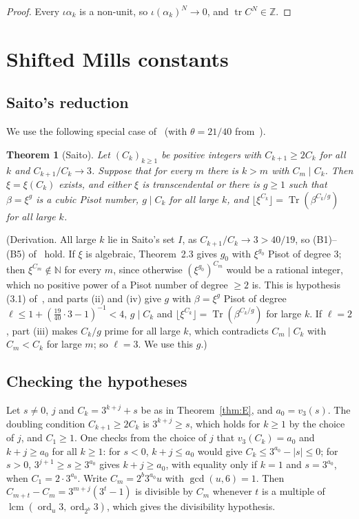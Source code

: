 \documentclass[11pt]{amsart}
\newtheorem{theorem}{Theorem}[section]
\theoremstyle{definition}
\newcommand{\Z}{\mathbb{Z}}
\newcommand{\N}{\mathbb{N}}
\newcommand{\tr}{\operatorname{tr}}
\newcommand{\Tr}{\operatorname{Tr}}
\newcommand{\ord}{\operatorname{ord}}
\newcommand{\floor}[1]{\lfloor #1 \rfloor}
\begin{document}
\begin{proof}
Every $\iota\alpha_k$ is a non-unit, so $\iota(\alpha_k)^N\to0$, and $\tr C^N\in\Z$.
\end{proof}

\section{Shifted Mills constants}\label{sec:E}

\subsection{Saito's reduction}
We use the following special case of~\cite[Theorem~2.3 and Proposition~3.1]{Sai25c} (with $\theta=21/40$ from~\cite{BHP01}).

\begin{theorem}[Saito]\label{thm:saito}
Let $(C_k)_{k\ge1}$ be positive integers with $C_{k+1}\ge2C_k$ for all $k$ and $C_{k+1}/C_k\to3$.  Suppose that for every $m$ there is $k>m$ with $C_m\mid C_k$.  Then $\xi=\xi(C_k)$ exists, and either $\xi$ is transcendental or there is $g\ge1$ such that $\beta=\xi^g$ is a cubic Pisot number, $g\mid C_k$ for all large $k$, and $\floor{\xi^{C_k}}=\Tr(\beta^{C_k/g})$ for all large $k$.
\end{theorem}

(Derivation.  All large $k$ lie in Saito's set $I$, as $C_{k+1}/C_k\to3>40/19$, so (B1)--(B5) of~\cite[Theorem~2.3]{Sai25c} hold.  If $\xi$ is algebraic, Theorem~2.3 gives $g_0$ with $\xi^{g_0}$ Pisot of degree $3$; then $\xi^{C_m}\notin\N$ for every $m$, since otherwise $(\xi^{g_0})^{C_m}$ would be a rational integer, which no positive power of a Pisot number of degree $\ge2$ is.  This is hypothesis (3.1) of~\cite[Proposition~3.1]{Sai25c}, and parts (ii) and (iv) give $g$ with $\beta=\xi^g$ Pisot of degree $\ell\le1+(\tfrac{19}{40}\cdot3-1)^{-1}<4$, $g\mid C_k$ and $\floor{\xi^{C_k}}=\Tr(\beta^{C_k/g})$ for large $k$.  If $\ell=2$, part (iii) makes $C_k/g$ prime for all large $k$, which contradicts $C_m\mid C_k$ with $C_m<C_k$ for large $m$; so $\ell=3$.  We use this $g$.)

\subsection{Checking the hypotheses}
Let $s\neq0$, $j$ and $C_k=3^{k+j}+s$ be as in Theorem~\ref{thm:E}, and $a_0=v_3(s)$.  The doubling condition $C_{k+1}\ge2C_k$ is $3^{k+j}\ge s$, which holds for $k\ge1$ by the choice of $j$, and $C_1\ge1$.  One checks from the choice of $j$ that $v_3(C_k)=a_0$ and $k+j\ge a_0$ for all $k\ge1$: for $s<0$, $k+j\le a_0$ would give $C_k\le3^{a_0}-|s|\le0$; for $s>0$, $3^{j+1}\ge s\ge3^{a_0}$ gives $k+j\ge a_0$, with equality only if $k=1$ and $s=3^{a_0}$, when $C_1=2\cdot3^{a_0}$.  Write $C_m=2^b3^{a_0}u$ with $\gcd(u,6)=1$.  Then $C_{m+t}-C_m=3^{m+j}(3^t-1)$ is divisible by $C_m$ whenever $t$ is a multiple of $\operatorname{lcm}(\ord_u3,\ord_{2^b}3)$, which gives the divisibility hypothesis.
\end{document}
